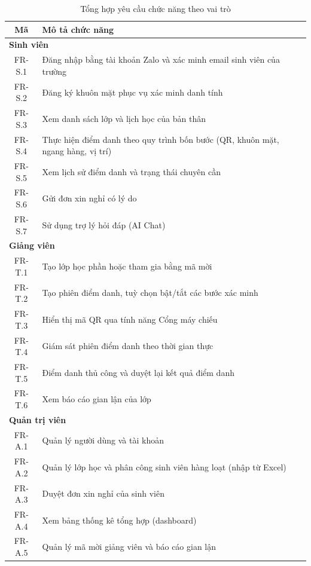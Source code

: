 \documentclass[../main.tex]{subfiles}
\begin{document}
\begin{table}[H]
\centering
\small
\caption{Tổng hợp yêu cầu chức năng theo vai trò}
\label{tab:fr}
\begin{tabular}{|c|p{12cm}|}
\hline
\textbf{Mã} & \textbf{Mô tả chức năng} \\
\hline
\multicolumn{2}{|l|}{\textbf{Sinh viên}} \\
\hline
FR-S.1 & Đăng nhập bằng tài khoản Zalo và xác minh email sinh viên của trường \\ \hline
FR-S.2 & Đăng ký khuôn mặt phục vụ xác minh danh tính \\ \hline
FR-S.3 & Xem danh sách lớp và lịch học của bản thân \\ \hline
FR-S.4 & Thực hiện điểm danh theo quy trình bốn bước (QR, khuôn mặt, ngang hàng, vị trí) \\ \hline
FR-S.5 & Xem lịch sử điểm danh và trạng thái chuyên cần \\ \hline
FR-S.6 & Gửi đơn xin nghỉ có lý do \\ \hline
FR-S.7 & Sử dụng trợ lý hỏi đáp (AI Chat) \\ \hline
\multicolumn{2}{|l|}{\textbf{Giảng viên}} \\
\hline
FR-T.1 & Tạo lớp học phần hoặc tham gia bằng mã mời \\ \hline
FR-T.2 & Tạo phiên điểm danh, tuỳ chọn bật/tắt các bước xác minh \\ \hline
FR-T.3 & Hiển thị mã QR qua tính năng Cổng máy chiếu \\ \hline
FR-T.4 & Giám sát phiên điểm danh theo thời gian thực \\ \hline
FR-T.5 & Điểm danh thủ công và duyệt lại kết quả điểm danh \\ \hline
FR-T.6 & Xem báo cáo gian lận của lớp \\ \hline
\multicolumn{2}{|l|}{\textbf{Quản trị viên}} \\
\hline
FR-A.1 & Quản lý người dùng và tài khoản \\ \hline
FR-A.2 & Quản lý lớp học và phân công sinh viên hàng loạt (nhập từ Excel) \\ \hline
FR-A.3 & Duyệt đơn xin nghỉ của sinh viên \\ \hline
FR-A.4 & Xem bảng thống kê tổng hợp (dashboard) \\ \hline
FR-A.5 & Quản lý mã mời giảng viên và báo cáo gian lận \\ \hline
\end{tabular}
\end{table}
\end{document}
